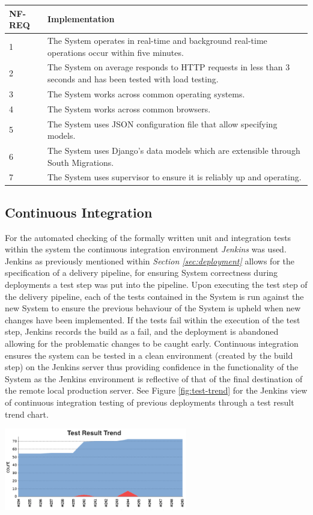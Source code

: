 \documentclass[11pt]{report}
\begin{document}
\begin{tabular}{ |p{2cm}||p{12.25cm}|}
 \hline
 NF-REQ & Implementation\\
 \hline
 1 & The System operates in real-time and background real-time operations occur within five minutes.\\
  \hline
 2 &   The System on average responds to HTTP requests in less than 3 seconds and has been tested with load testing.\\
  \hline
 3 & The System works across common operating systems.\\
  \hline
 4 & The System works across common browsers.\\
  \hline
 5 & The System uses JSON configuration file that allow specifying models.\\
  \hline
 6 & The System uses Django's data models which are extensible through South Migrations.\\
  \hline
 7 & The System uses supervisor to ensure it is reliably up and operating.\\
 \hline
\end{tabular}
\label{table:nonfunc-requirements}

\subsection*{Continuous Integration}
For the automated checking of the formally written unit and integration tests within the system the continuous integration environment \textit{Jenkins} was used. Jenkins as previously mentioned within \textit{Section \ref{sec:deployment}} allows for the specification of a delivery pipeline, for ensuring System correctness during deployments a test step was put into the pipeline. Upon executing the test step of the delivery pipeline, each of the tests contained in the System is run against the new System to ensure the previous behaviour of the System is upheld when new changes have been implemented. If the tests fail within the execution of the test step, Jenkins records the build as a fail, and the deployment is abandoned allowing for the problematic changes to be caught early. Continuous integration ensures the system can be tested in a clean environment (created by the build step) on the Jenkins server thus providing confidence in the functionality of the System as the Jenkins environment is reflective of that of the final destination of the remote local production server. See Figure \ref{fig:test-trend} for the Jenkins view of continuous integration testing of previous deployments through a test result trend chart.

\begin{center}
  \includegraphics[width=0.6\textwidth]{images/test-trend.png}
  \label{fig:test-trend}
\end{center}
\end{document}
